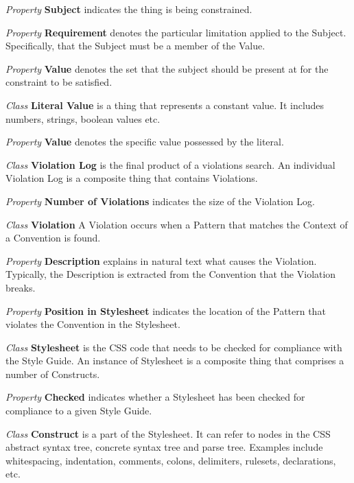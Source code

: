 \begin{description}
\textit{Property} \textbf{Subject} indicates the thing is being constrained.

\textit{Property} \textbf{Requirement} denotes the particular limitation applied to the Subject. Specifically, that the Subject must be a member of the Value.

\textit{Property} \textbf{Value} denotes the set that the subject should be present at for the constraint to be satisfied.


\item\textit{Class} \textbf{Literal Value} is a thing that represents a constant value. It includes numbers, strings, boolean values etc.

\textit{Property} \textbf{Value} denotes the specific value possessed by the literal.


\item\textit{Class} \textbf{Violation Log} is the final product of a violations search. An individual Violation Log is a composite thing that contains Violations.

\textit{Property} \textbf{Number of Violations} indicates the size of the Violation Log. 


\item\textit{Class} \textbf{Violation} A Violation occurs when a Pattern that matches the Context of a Convention is found.

\textit{Property} \textbf{Description} explains in natural text what causes the Violation. Typically, the Description is extracted from the Convention that the Violation breaks.

\textit{Property} \textbf{Position in Stylesheet} indicates the location of the Pattern that violates the Convention in the Stylesheet. 


\item\textit{Class} \textbf{Stylesheet} is the CSS code that needs to be checked for compliance with the Style Guide. An instance of Stylesheet is a composite thing that comprises a number of Constructs.

\textit{Property} \textbf{Checked} indicates whether a Stylesheet has been checked for compliance to a given Style Guide. 


\item\textit{Class} \textbf{Construct} is a part of the Stylesheet. It can refer to nodes in the CSS abstract syntax tree, concrete syntax tree and parse tree. Examples include whitespacing, indentation, comments, colons, delimiters, rulesets, declarations, etc.


\end{description}
